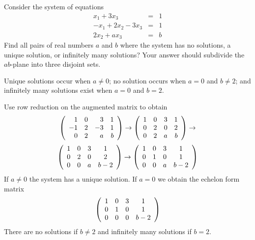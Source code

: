 \documentclass{ximera}
\author{YOUR NAME}
\begin{document}

\begin{exercise}\label{c2.4.2b.2}

Consider the system of equations
\[
\begin{array}{rcl}
x_1 + 3x_3 & = & 1 \\
-x_1+2x_2-3x_3 & = & 1\\
2x_2 + ax_3 & = & b
\end{array}
\]
Find all pairs of real numbers $a$ and $b$ where the system has no solutions, a unique solution, or infinitely many solutions?  Your answer should subdivide the $ab$-plane into three disjoint sets.
  
\begin{solution}

\ans Unique solutions occur when $a\neq 0$; no solution occurs when $a=0$ and $b\neq 2$; and infinitely many solutions exist when $a = 0$ and $b =2$.

\soln 
Use row reduction on the augmented matrix to obtain
\[
\left(\begin{array}{rrrrrrrrrrrrrrrrrr} 1 & 0 & 3 & 1\\ -1 & 2 & -3 & 1 \\ 0 & 2 & a & b \end{array}\right) \to
\left(\begin{array}{rrrrrrrrrrrrrrrrrr} 1 & 0 & 3 & 1\\  0 & 2 & 0 & 2 \\ 0 & 2 & a & b \end{array}\right) \to
\]
\[
\left(\begin{array}{cccccccccccc} 1 & 0 & 3 & 1\\  0 & 2 & 0 & 2 \\ 0 & 0 & a & b - 2 \end{array}\right) \to
\left(\begin{array}{cccccccccccc} 1 & 0 & 3 & 1\\  0 & 1 & 0 & 1 \\ 0 & 0 & a & b - 2 \end{array}\right) 
\]
If $a\neq 0$ the system has a unique solution. If $a = 0$ we obtain the echelon form matrix
\[
\left(\begin{array}{cccccccccccc} 1 & 0 & 3 & 1\\  0 & 1 & 0 & 1 \\ 0 & 0 & 0 & b - 2 \end{array}\right)
\]  
There are no solutions if $b\neq 2$ and infinitely many solutions if $b = 2$.

\end{solution}
\end{exercise}
\end{document}
